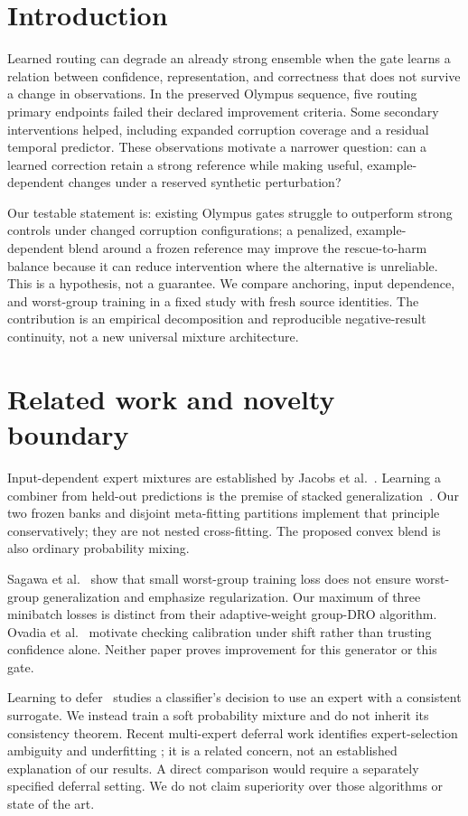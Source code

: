\section{Introduction}
Learned routing can degrade an already strong ensemble when the gate learns a
relation between confidence, representation, and correctness that does not
survive a change in observations. In the preserved Olympus sequence, five
routing primary endpoints failed their declared improvement criteria. Some
secondary interventions helped, including expanded corruption coverage and a
residual temporal predictor. These observations motivate a narrower question:
can a learned correction retain a strong reference while making useful,
example-dependent changes under a reserved synthetic perturbation?

Our testable statement is: existing Olympus gates struggle to outperform strong
controls under changed corruption configurations; a penalized, example-dependent
blend around a frozen reference may improve the rescue-to-harm balance because
it can reduce intervention where the alternative is unreliable. This is a
hypothesis, not a guarantee. We compare anchoring, input dependence, and
worst-group training in a fixed study with fresh source identities. The
contribution is an empirical decomposition and reproducible negative-result
continuity, not a new universal mixture architecture.

\section{Related work and novelty boundary}
Input-dependent expert mixtures are established by Jacobs et al.\ \cite{jacobs1991}.
Learning a combiner from held-out predictions is the premise of stacked
generalization\ \cite{wolpert1992}. Our two frozen banks and disjoint meta-fitting
partitions implement that principle conservatively; they are not nested
cross-fitting. The proposed convex blend is also ordinary probability mixing.

Sagawa et al.\ \cite{sagawa2020} show that small worst-group training loss does
not ensure worst-group generalization and emphasize regularization. Our maximum
of three minibatch losses is distinct from their adaptive-weight group-DRO
algorithm. Ovadia et al.\ \cite{ovadia2019} motivate checking calibration under
shift rather than trusting confidence alone. Neither paper proves improvement
for this generator or this gate.

Learning to defer\ \cite{mozannar2020} studies a classifier's decision to use
an expert with a consistent surrogate. We instead train a soft probability
mixture and do not inherit its consistency theorem. Recent multi-expert
deferral work identifies expert-selection ambiguity and underfitting
\cite{liu2026}; it is a related concern, not an established explanation of our
results. A direct comparison would require a separately specified deferral
setting. We do not claim superiority over those algorithms or state of the art.

